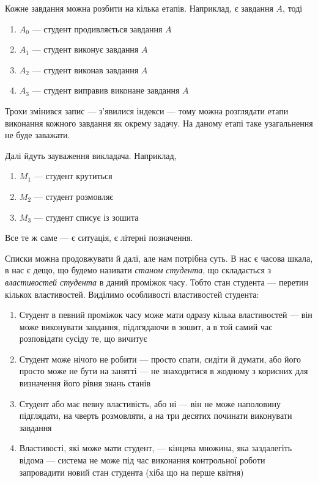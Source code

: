 Кожне завдання можна розбити на кілька етапів.
Наприклад, є завдання $A$, тоді
\begin{enumerate}
  \item
    $A_0$ --- студент продивляється завдання $A$
  \item
    $A_1$ --- студент виконує завдання $A$
  \item
    $A_2$ --- студент виконав завдання $A$
  \item
    $A_3$ --- студент виправив виконане завдання $A$
\end{enumerate}

Трохи змінився запис --- з’явилися індекси --- тому можна розглядати етапи
виконання кожного завдання як окрему задачу.
На даному етапі таке узагальнення не буде заважати.

Далі йдуть зауваження викладача. Наприклад,
\begin{enumerate}
  \item
    $M_1$ --- студент крутиться
  \item
    $M_2$ --- студент розмовляє
  \item
    $M_3$ --- студент списує із зошита
\end{enumerate}

Все те ж саме --- є ситуація, є літерні позначення.

Списки можна продовжувати й далі, але нам потрібна суть.
В нас є часова шкала, в нас є дещо, що будемо називати
\textit{станом студента}, що складається з \textit{властивостей студента}
в даний проміжок часу.
Тобто стан студента --- перетин кількох властивостей.
Виділимо особливості властивостей студента:

\begin{enumerate}
  \item 
    Студент в певний проміжок часу може мати одразу кілька властивостей --- він
    може виконувати завдання, підлгядаючи в зошит, а в той самий час розповідати
    сусіду те, що вичитує
  \item
    Студент може нічого не робити --- просто спати, сидіти й думати,
    або його просто може не бути на занятті --- не знаходитися в жодному з
    корисних для визначення його рівня знань станів
  \item
    Студент або має певну властивість, або ні ---
    він не може наполовину підглядати, на чверть розмовляти, а на три
    десятих починати виконувати завдання
  \item
    Властивості, які може мати студент, --- кінцева множина, яка заздалегіть
    відома --- система не може під час виконання контрольної роботи запровадити
    новий стан студента (хіба що на перше квітня)
\end{enumerate}

